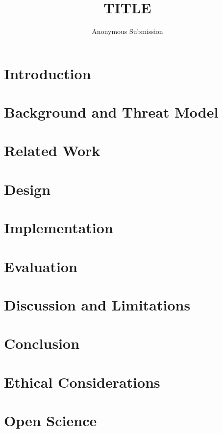 \documentclass[letterpaper,twocolumn,10pt]{article}
\begin{document}
\date{}
\title{\Large \bf TITLE}
\author{{\rm Anonymous Submission}}
\maketitle

\begin{abstract}
\end{abstract}

\section{Introduction}

\section{Background and Threat Model}

\section{Related Work}

\section{Design}

\section{Implementation}

\section{Evaluation}

\section{Discussion and Limitations}

\section{Conclusion}




\appendix
\section*{Ethical Considerations}

\section*{Open Science}
\end{document}

